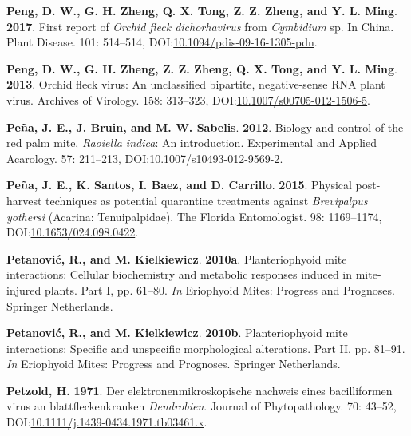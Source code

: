 \documentclass[12pt,final,CPage]{ufthesis}
\newlength{\cslhangindent}
\newenvironment{CSLReferences}[2] %
{%
	\setlength{\parindent}{0pt}
	\ifodd #1 \everypar{\setlength{\hangindent}{\cslhangindent}}\ignorespaces\fi
	\ifnum #2 > 0
	\setlength{\parskip}{#2\baselineskip}
	\fi
}%
{}
\begin{document}
{\begin{CSLReferences}{1}{0}
  \leavevmode{}%
  \textbf{Peng, D. W., G. H. Zheng, Q. X. Tong, Z. Z. Zheng, and Y. L. Ming}. \textbf{2017}. First report of {\emph{Orchid fleck dichorhavirus}} from {\emph{Cymbidium}} sp. In {China}. Plant Disease. 101: 514--514, DOI:\href{https://doi.org/10.1094/pdis-09-16-1305-pdn}{10.1094/pdis-09-16-1305-pdn}.

  \leavevmode{}%
  \textbf{Peng, D. W., G. H. Zheng, Z. Z. Zheng, Q. X. Tong, and Y. L. Ming}. \textbf{2013}. {Orchid fleck virus}: An unclassified bipartite, negative-sense {RNA} plant virus. Archives of Virology. 158: 313--323, DOI:\href{https://doi.org/10.1007/s00705-012-1506-5}{10.1007/s00705-012-1506-5}.

  \leavevmode{}%
  \textbf{Peña, J. E., J. Bruin, and M. W. Sabelis}. \textbf{2012}. Biology and control of the red palm mite, {\emph{Raoiella indica}}: An introduction. Experimental and Applied Acarology. 57: 211--213, DOI:\href{https://doi.org/10.1007/s10493-012-9569-2}{10.1007/s10493-012-9569-2}.

  \leavevmode{}%
  \textbf{Peña, J. E., K. Santos, I. Baez, and D. Carrillo}. \textbf{2015}. Physical post-harvest techniques as potential quarantine treatments against {\emph{Brevipalpus yothersi}} ({Acarina}: {Tenuipalpidae}). The Florida Entomologist. 98: 1169--1174, DOI:\href{https://doi.org/10.1653/024.098.0422}{10.1653/024.098.0422}.

  \leavevmode{}%
  \textbf{Petanović, R., and M. Kielkiewicz}. \textbf{2010a}. Plant{\textendash}eriophyoid mite interactions: Cellular biochemistry and metabolic responses induced in mite-injured plants. Part {I}, pp. 61--80. \emph{In} Eriophyoid Mites: Progress and Prognoses. Springer Netherlands.

  \leavevmode{}%
  \textbf{Petanović, R., and M. Kielkiewicz}. \textbf{2010b}. Plant{\textendash}eriophyoid mite interactions: Specific and unspecific morphological alterations. Part {II}, pp. 81--91. \emph{In} Eriophyoid Mites: Progress and Prognoses. Springer Netherlands.

  \leavevmode{}%
  \textbf{Petzold, H.} \textbf{1971}. Der elektronenmikroskopische nachweis eines bacilliformen virus an blattfleckenkranken {\emph{Dendrobien}}. Journal of Phytopathology. 70: 43--52, DOI:\href{https://doi.org/10.1111/j.1439-0434.1971.tb03461.x}{10.1111/j.1439-0434.1971.tb03461.x}.


\end{CSLReferences}}
\end{document}
